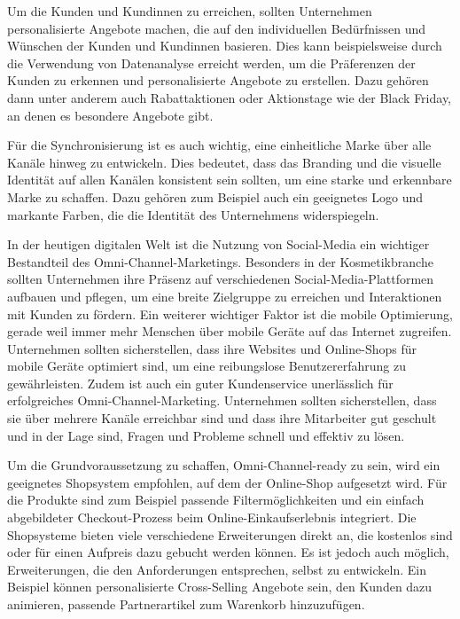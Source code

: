 Um die Kunden und Kundinnen zu erreichen, sollten Unternehmen personalisierte Angebote machen, die auf den individuellen Bedürfnissen und Wünschen der Kunden und Kundinnen basieren. Dies kann beispielsweise durch die Verwendung von Datenanalyse erreicht werden, um die Präferenzen der Kunden zu erkennen und personalisierte Angebote zu erstellen. Dazu gehören dann unter anderem auch Rabattaktionen oder Aktionstage wie der Black Friday, an denen es besondere Angebote gibt.
\newline

Für die Synchronisierung ist es auch wichtig, eine einheitliche Marke über alle Kanäle hinweg zu entwickeln. Dies bedeutet, dass das Branding und die visuelle Identität auf allen Kanälen konsistent sein sollten, um eine starke und erkennbare Marke zu schaffen. Dazu gehören zum Beispiel auch ein geeignetes Logo und markante Farben, die die Identität des Unternehmens widerspiegeln.
\newline

In der heutigen digitalen Welt ist die Nutzung von Social-Media ein wichtiger Bestandteil des Omni-Channel-Marketings. Besonders in der Kosmetikbranche sollten Unternehmen ihre Präsenz auf verschiedenen Social-Media-Plattformen aufbauen und pflegen, um eine breite Zielgruppe zu erreichen und Interaktionen mit Kunden zu fördern. Ein weiterer wichtiger Faktor ist die mobile Optimierung, gerade weil immer mehr Menschen über mobile Geräte auf das Internet zugreifen. Unternehmen sollten sicherstellen, dass ihre Websites und Online-Shops für mobile Geräte optimiert sind, um eine reibungslose Benutzererfahrung zu gewährleisten. Zudem ist auch ein guter Kundenservice unerlässlich für erfolgreiches Omni-Channel-Marketing. Unternehmen sollten sicherstellen, dass sie über mehrere Kanäle erreichbar sind und dass ihre Mitarbeiter gut geschult und in der Lage sind, Fragen und Probleme schnell und effektiv zu lösen.
\newline

Um die Grundvoraussetzung zu schaffen, Omni-Channel-ready zu sein, wird ein geeignetes Shopsystem empfohlen, auf dem der Online-Shop aufgesetzt wird. Für die Produkte sind zum Beispiel passende Filtermöglichkeiten und ein einfach abgebildeter Checkout-Prozess beim Online-Einkaufserlebnis integriert. Die Shopsysteme bieten viele verschiedene Erweiterungen direkt an, die kostenlos sind oder für einen Aufpreis dazu gebucht werden können. Es ist jedoch auch möglich, Erweiterungen, die den Anforderungen entsprechen, selbst zu entwickeln. Ein Beispiel können personalisierte Cross-Selling Angebote sein, den Kunden dazu animieren, passende Partnerartikel zum Warenkorb hinzuzufügen.
\newline

